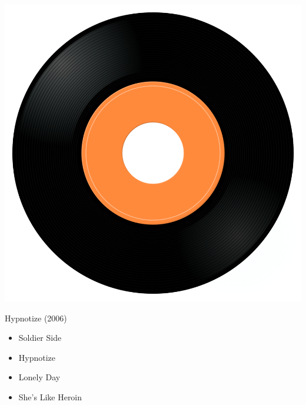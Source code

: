 \begin{minipage}[t]{0.25\textwidth}
\captionsetup{type=figure}
\includegraphics[width=\textwidth]{Images/cover.png}
\caption*{Hypnotize (2006)}
\end{minipage}
\begin{minipage}[t]{0.25\textwidth}\vspace{0pt}
\begin{itemize}[nosep,leftmargin=1em,labelwidth=*,align=left]
	\setlength{\itemsep}{0pt}
	\item Soldier Side
	\item Hypnotize
	\item Lonely Day
	\item She's Like Heroin
\end{itemize}
\end{minipage}
